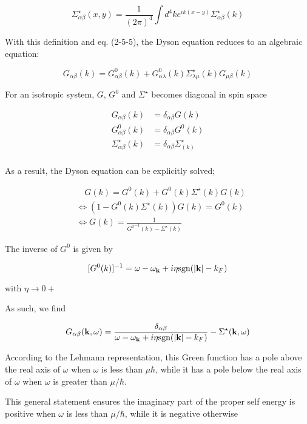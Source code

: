 \[
\Sigma_{\alpha\beta}^{\star}(x,y) = \frac{1}{(2\pi)^4}\int d^4 k e^{ik(x-y)}\Sigma_{\alpha\beta}^{\star}(k)\]

With this definition and eq. (2-5-5), the Dyson equation reduces to an algebraic equation: 

\[G_{\alpha\beta}(k) = G^0_{\alpha\beta}(k) + G_{\alpha\lambda}^0(k)\Sigma_{\lambda\mu}^{\star}(k)G_{\mu\beta}(k) \]

For an isotropic system, $G$, $G^0$ and $\Sigma^\star$ becomes diagonal in spin space

\[\begin{split}
G_{\alpha\beta}(k) &= \delta_{\alpha\beta}G(k)\\
G^0_{\alpha\beta}(k) &= \delta_{\alpha\beta}G^0(k)\\
\Sigma^\star_{\alpha\beta}(k) &= \delta_{\alpha\beta}\Sigma^\star_(k)\\
\end{split}\]

As a result, the Dyson equation can be explicitly solved;

\[\begin{split}
&\quad G(k) = G^0(k) + G^0(k)\Sigma^\star(k)G(k)\\
&\Longleftrightarrow (1-G^0(k)\Sigma^\star(k))G(k)=G^0(k)\\
&\Longleftrightarrow G(k) = \frac{1}{{G^0}^{-1}(k)-\Sigma^\star(k)}
\end{split} \]

The inverse of $G^0$ is given by

\[[G^0(k)]^{-1} = \omega - \omega_{\bf k}+i\eta \text{sgn}(|{\bf k}|-k_F) \]

with $\eta\to 0+$

As such, we find

\[G_{\alpha\beta}({\bf k},\omega) = \frac{\delta_{\alpha\beta}}{\omega-\omega_{\bf k}+i\eta\text{sgn}(|{\bf k}|-k_F)}-\Sigma^\star({\bf k},\omega) \]

According to the Lehmann representation, this Green function has a pole above the real axis of $\omega$ when $\omega$ is less than $\mu\hbar$, while it has a pole below the real axis of $\omega$ when $\omega$ is greater than $\mu/\hbar$. 

This general statement ensures the imaginary part of the proper self energy is positive when $\omega$ is less than $\mu/\hbar$, while it is negative otherwise


